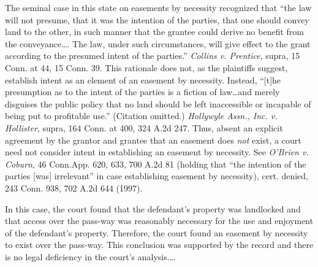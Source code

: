 The seminal case in this state on easements by necessity recognized that ``the
law will not presume, that it was the intention of the parties, that one should
convey land to the other, in such manner that the grantee could derive no
benefit from the conveyance\ldots. The law, under such circumstances, will give
effect to the grant according to the presumed intent of the parties.''
\textit{Collins v. Prentice},  supra, 15 Conn. at 44, 15 Conn. 39. This
rationale does not, as the plaintiffs suggest, establish intent as an element of
an easement by necessity. Instead, ``[t]he presumption as to the intent of the
parties is a fiction of law\ldots and merely disguises the public policy that no
land should be left inaccessible or incapable of being put to profitable use.''
(Citation omitted.) \textit{Hollywyle Assn., Inc. v. Hollister},  supra, 164
Conn. at 400, 324 A.2d 247. Thus, absent an explicit agreement by the grantor
and grantee that an easement does \textit{not} exist, a court need not consider
intent in establishing an easement by necessity. See \textit{O'Brien v. Coburn},
 46 Conn.App. 620, 633, 700 A.2d 81 (holding that ``the intention of the parties
[was] irrelevant'' in case establishing easement by necessity), cert. denied,
243 Conn. 938, 702 A.2d 644 (1997).

In this case, the court found that the defendant's property was landlocked and
that access over the pass-way was reasonably necessary for the use and enjoyment
of the defendant's property. Therefore, the court found an easement by necessity
to exist over the pass-way. This conclusion was supported by the record and
there is no legal deficiency in the court's analysis.\ldots


